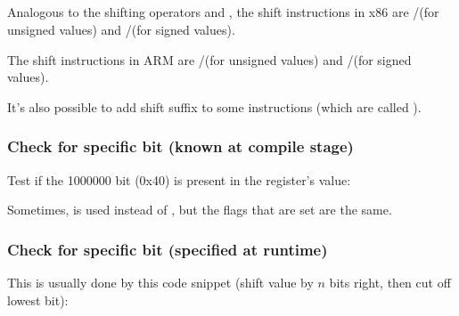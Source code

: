 ﻿%
\subsection{\Conclusion{}}


Analogous to the \CCpp shifting operators \TT{$\ll$} and \TT{$\gg$},
the shift instructions in x86 are \SHR/\SHL (for unsigned values) and \SAR/\SHL (for signed values).


The shift instructions in ARM are \LSR/\LSL (for unsigned values) and \ASR/\LSL (for signed values).

It's also possible to add shift suffix to some instructions 
(which are called ).

\subsubsection{Check for specific bit (known at compile stage)}

Test if the 1000000 bit (0x40) is present in the register's value:










Sometimes, \AND is used instead of \TEST, but the flags that are set are the same.

\subsubsection{Check for specific bit (specified at runtime)}

This is usually done by this \CCpp code snippet (shift value by $n$ bits right, then cut off lowest bit):



